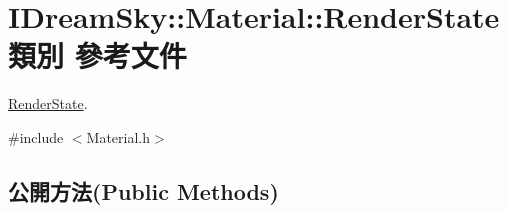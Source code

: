 \hypertarget{class_i_dream_sky_1_1_material_1_1_render_state}{}\section{I\+Dream\+Sky\+:\+:Material\+:\+:Render\+State 類別 參考文件}
\label{class_i_dream_sky_1_1_material_1_1_render_state}


\hyperlink{class_i_dream_sky_1_1_material_1_1_render_state}{Render\+State}.  




{\ttfamily \#include $<$Material.\+h$>$}

\subsection*{公開方法(Public Methods)}
